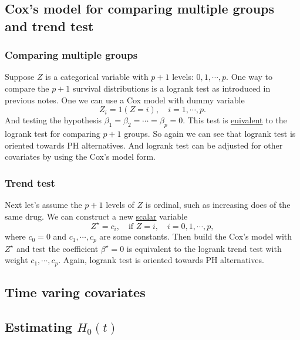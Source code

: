 \documentclass[a4paper,12pt]{article}
\begin{document}
\subsection{Cox's model for comparing multiple groups and trend test}
\label{sec:coxs-model-comparing}

\subsubsection{Comparing multiple groups}
\label{sec:comp-mult-groups}

Suppose $Z$ is a categorical variable with $p + 1$ levels: $0, 1, \cdots, p$. One way to compare the $p+1$ survival distributions is a logrank test as introduced in previous notes. One we can use a Cox model with dummy variable
\[
  Z_i = 1\left(Z = i\right), \quad i = 1, \cdots, p.
\]
And testing the hypothesis $\beta_1 = \beta_2 = \cdots = \beta_p = 0$. This test is \underline{euivalent} to the logrank test for comparing $p + 1$ groups. So again we can see that logrank test is oriented towards PH alternatives. And logrank test can be adjusted for other covariates by using the Cox's model form.
\par

\subsubsection{Trend test}
\label{sec:trend-test}

Next let's assume the $p + 1$ levels of $Z$ is ordinal, such as increasing does of the same drug. We can construct a new \underline{scalar} variable
\[
  Z^\star = c_i
  ,\quad \text{if }Z = i
  ,\quad i = 0, 1, \cdots, p
  ,
\]
where $c_0 = 0$ and $c_1, \cdots, c_p$ are some constants. Then build the Cox's model with $Z^\star$ and test the coefficient $\beta^\star = 0$ is equivalent to the logrank trend test with weight $c_1, \cdots, c_p$. Again, logrank test is oriented towards PH alternatives.

\subsection{Time varing covariates}
\label{sec:time-varing-covar}


\subsection{Estimating $H_0\left(t\right)$}
\label{sec:estim-h_0l}
\end{document}
